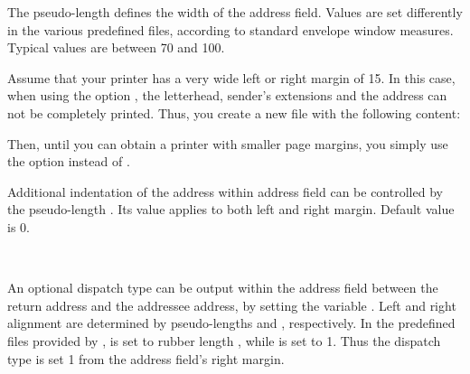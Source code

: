 \begin{Declaration}
\end{Declaration}
%
The pseudo-length  defines the width of the
address field. Values are set differently in the various predefined
 files, according to standard envelope window
measures. Typical values are between 70 and 100.
\begin{Example}
  Assume that your printer has a very wide left or right margin of
  15. In this case, when using the option , the
  letterhead, sender's extensions and the address can not be
  completely printed. Thus, you create a new  file with the
  following content:
  Then, until you can obtain a printer with smaller page margins, you
  simply use the option  instead of .
\end{Example}
%
%


\begin{Declaration}
\end{Declaration}
%
Additional indentation of the address within address field can be
controlled by the pseudo-length . Its value
applies to both left and right margin. Default value is 0.
%
%


\begin{Declaration}
  \\
\end{Declaration}
%
%
An optional dispatch type can be output within the address field
between the return address and the addressee address, by setting the
variable . Left and right alignment are
determined by pseudo-lengths  and
, respectively. In the predefined
 files provided by \KOMAScript, 
is set to rubber length , while
 is set to 1. Thus the
dispatch type is set 1 from the address field's right margin.
%
%
%


